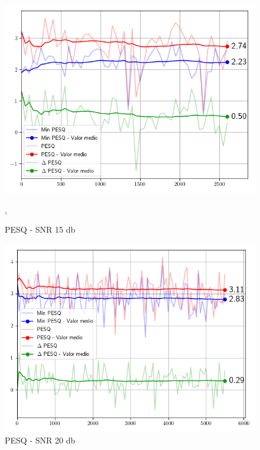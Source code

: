\begin{figure}
	\centering
	\centerline{\includegraphics[scale=0.70]{images/ch7/objective_metrics/metric_PESQ_15db.png}}
	\caption{PESQ - SNR 15 db}
	\label{fig:ch7_pesq_fifteen_db},
\end{figure}

\begin{figure}
	\centering
	\centerline{\includegraphics[scale=0.70]{images/ch7/objective_metrics/metric_PESQ_20db.png}}
	\caption{PESQ - SNR 20 db}
	\label{fig:ch7_pesq_tweenty_db}
\end{figure}

